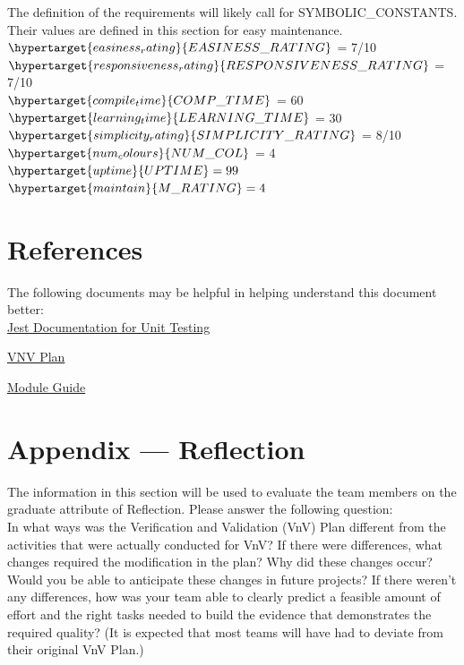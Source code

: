 \documentclass[12pt, titlepage]{article}
\begin{document}
The definition of the requirements will likely call for SYMBOLIC\_CONSTANTS.
Their values are defined in this section for easy maintenance.\\

\noindent $\hypertarget{easiness_rating}{EASINESS\_RATING}$ = 7/10 \\
$\hypertarget{responsiveness_rating}{RESPONSIVENESS\_RATING}$ = 7/10 \\
$\hypertarget{compile_time}{COMP\_TIME}$ = 60 \\
$\hypertarget{learning_time}{LEARNING\_TIME}$  = 30\\
$\hypertarget{simplicity_rating}{SIMPLICITY\_RATING}$ = 8/10\\
$\hypertarget{num_colours}{NUM\_COL}$ = 4\\
$\hypertarget{uptime}{UPTIME} = 99$\\
$\hypertarget{maintain}{M\_RATING} = 4$\\
	




\newpage{}

\section{References}

The following documents may be helpful in helping understand this document better:\\

\href{https://jestjs.io/docs/getting-started}{Jest Documentation for Unit Testing}

\href{https://github.com/RutheniumVI/UnderTree/blob/main/docs/VnVPlan/VnVPlan.pdf}{VNV Plan}

\href{https://github.com/RutheniumVI/UnderTree/blob/main/docs/Design/MG/MG.pdf}{Module Guide}

\section*{Appendix --- Reflection}

The information in this section will be used to evaluate the team members on the
graduate attribute of Reflection.  Please answer the following question: \\

  In what ways was the Verification and Validation (VnV) Plan different
  from the activities that were actually conducted for VnV?  If there were
  differences, what changes required the modification in the plan?  Why did
  these changes occur?  Would you be able to anticipate these changes in future
  projects?  If there weren't any differences, how was your team able to clearly
  predict a feasible amount of effort and the right tasks needed to build the
  evidence that demonstrates the required quality?  (It is expected that most
  teams will have had to deviate from their original VnV Plan.)
\end{document}
